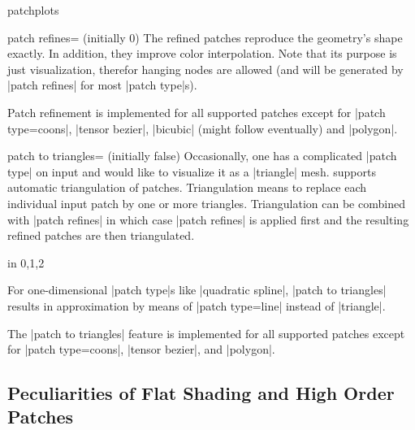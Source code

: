 {\begin{pgfplotslibrary}{patchplots}
\begin{pgfplotskey}{patch refines= (initially 0)}
    The refined patches reproduce the geometry's shape exactly. In addition,
    they improve color interpolation. Note that its purpose is just
    visualization, therefor hanging nodes are allowed (and will be generated by
    |patch refines| for most |patch type|s).

    Patch refinement is implemented for all supported patches except for
    |patch type=coons|, |tensor bezier|, |bicubic| (might follow eventually)
    and |polygon|.
\end{pgfplotskey}

\begin{pgfplotskey}{patch to triangles= (initially false)}
    Occasionally, one has a complicated |patch type| on input and would like to
    visualize it as a |triangle| mesh. \PGFPlots{} supports automatic
    triangulation of patches. Triangulation means to replace each individual
    input patch by one or more triangles. Triangulation can be combined with
    |patch refines| in which case |patch refines| is applied first and the
    resulting refined patches are then triangulated.
\begin{codeexample}[]
\foreach \level in {0,1,2} {%
}
\end{codeexample}

    For one-dimensional |patch type|s like |quadratic spline|,
    |patch to triangles| results in approximation by means of |patch type=line|
    instead of |triangle|.

    The |patch to triangles| feature is implemented for all supported patches
    except for |patch type=coons|, |tensor bezier|, and |polygon|.
\end{pgfplotskey}


\subsection{Peculiarities of Flat Shading and High Order Patches}
\label{sec:lib:patchplots:flat}


\end{pgfplotslibrary}}
